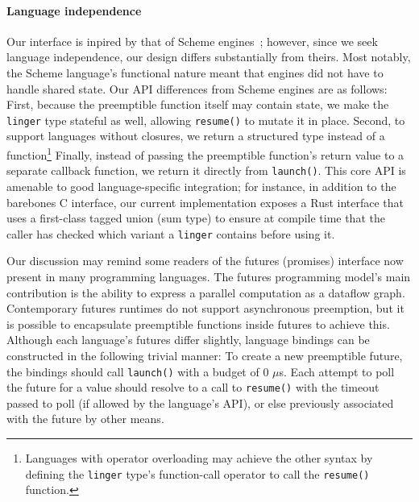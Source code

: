 \paragraph{Language independence}
Our interface is inpired by that of Scheme engines~\cite{haynes:iucs1984}; however,
since we seek language independence, our design differs substantially from theirs.
Most notably, the Scheme language's functional nature meant that engines did not have
to handle shared state.  Our API differences from Scheme engines are as follows:
First, because the preemptible function itself may contain state, we make the
\texttt{linger} type stateful as well, allowing \texttt{resume()} to mutate it in
place.  Second, to support languages without closures, we
return a structured type instead of a function\footnote{Languages with operator
overloading may achieve the other syntax by defining the \texttt{linger} type's
function-call operator to call the \texttt{resume()} function.}
Finally, instead of passing the
preemptible function's return value to a separate callback function, we return it
directly from \texttt{launch()}.  This core API is amenable to good language-specific
integration; for instance, in addition to the barebones C interface, our current
implementation exposes a Rust interface that uses a first-class tagged union (sum
type) to ensure at compile time that the caller has checked which variant a
\texttt{linger} contains before using it.

\vspace{\parsep}
Our discussion may remind some readers of the futures (promises) interface now
present in many programming languages.  The futures programming model's main
contribution is the ability to express a parallel computation as a dataflow graph.
Contemporary futures runtimes do not support asynchronous preemption, but it is
possible to encapsulate preemptible functions inside futures to achieve this.
Although each language's futures differ slightly,
language bindings can be constructed in the following trivial manner:
To create a new preemptible future, the bindings should call \texttt{launch()} with a
budget of 0 $\mu$s.  Each attempt to poll the future for a value should resolve to a
call to \texttt{resume()} with the timeout passed to poll (if allowed by the
language's API), or else previously associated with the future by other means.
